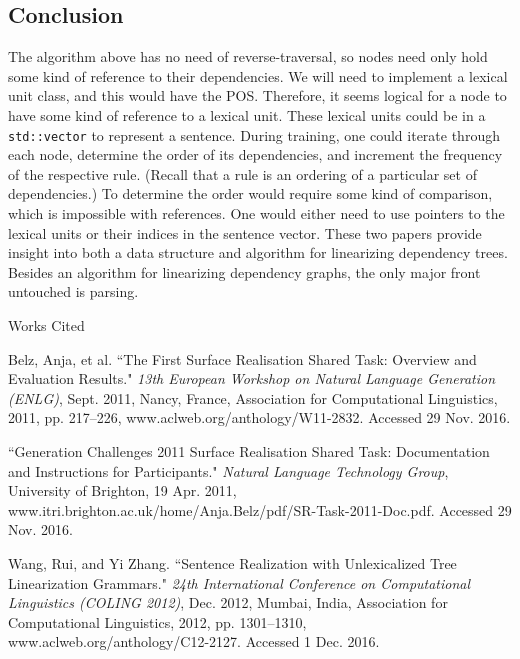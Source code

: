 \documentclass[12pt,letterpaper]{article}
\newenvironment{workscited}{
  \newcommand{\bibentry}{\noindent{}\hangindent=0.5in}
  \newpage{}
  {\centering{}Works Cited\par{}}
}{\newpage{}}
\begin{document}
\begin{flushleft}
  \section*{Conclusion}
  The algorithm above has no need of reverse-traversal, so nodes need only hold some kind of reference to their dependencies. We will need to implement a lexical unit class, and this would have the POS. Therefore, it seems logical for a node to have some kind of reference to a lexical unit. These lexical units could be in a \texttt{std::vector} to represent a sentence. During training, one could iterate through each node, determine the order of its dependencies, and increment the frequency of the respective rule. (Recall that a rule is an ordering of a particular set of dependencies.) To determine the order would require some kind of comparison, which is impossible with references. One would either need to use pointers to the lexical units or their indices in the sentence vector. These two papers provide insight into both a data structure and algorithm for linearizing dependency trees. Besides an algorithm for linearizing dependency graphs, the only major front untouched is parsing.
  \begin{workscited}
    \bibentry{}Belz, Anja, et al. ``The First Surface Realisation Shared Task: Overview and Evaluation Results." \textit{13th European Workshop on Natural Language Generation (ENLG)}, Sept. 2011, Nancy, France, Association for Computational Linguistics, 2011, pp. 217--226, www.aclweb.org/anthology/W11-2832. Accessed 29 Nov. 2016.

    \bibentry{}``Generation Challenges 2011 Surface Realisation Shared Task: Documentation and Instructions for Participants." \textit{Natural Language Technology Group}, University of Brighton, 19 Apr. 2011, www.itri.brighton.ac.uk/home/Anja.Belz/pdf/SR-Task-2011-Doc.pdf. Accessed 29 Nov. 2016.

    \bibentry{}Wang, Rui, and Yi Zhang. ``Sentence Realization with Unlexicalized Tree Linearization Grammars." \textit{24th International Conference on Computational Linguistics (COLING 2012)}, Dec. 2012, Mumbai, India, Association for Computational Linguistics, 2012, pp. 1301--1310, www.aclweb.org/anthology/C12-2127. Accessed 1 Dec. 2016.
  \end{workscited}
\end{flushleft}
\end{document}
